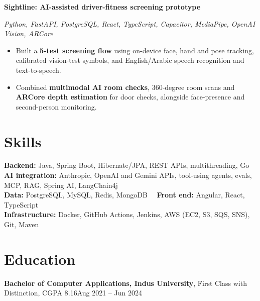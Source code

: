 \documentclass[10pt, letterpaper]{article}
\newenvironment{highlights}{
    \begin{itemize}[
        topsep=0.06 cm,
        parsep=0.04 cm,
        partopsep=0pt,
        itemsep=0pt,
        leftmargin=0.4 cm
    ]
}{
    \end{itemize}
}
\newcommand{\sub}[1]{{\small\textit{#1}}\par}
\begin{document}
    \vspace{0.12 cm}
    \textbf{Sightline: AI-assisted driver-fitness screening prototype}\par
    \sub{Python, FastAPI, PostgreSQL, React, TypeScript, Capacitor, MediaPipe, OpenAI Vision, ARCore}
    \begin{highlights}
        \item Built a \textbf{5-test screening flow} using on-device face, hand and pose tracking, calibrated vision-test
              symbols, and English/Arabic speech recognition and text-to-speech.
        \item Combined \textbf{multimodal AI room checks}, 360-degree room scans and \textbf{ARCore depth estimation}
              for door checks, alongside face-presence and second-person monitoring.
    \end{highlights}

    \section{Skills}

    \textbf{Backend:} Java, Spring Boot, Hibernate/JPA, REST APIs, multithreading, Go \\
    \textbf{AI integration:} Anthropic, OpenAI and Gemini APIs, tool-using agents, evals, MCP, RAG, Spring AI, LangChain4j \\
    \textbf{Data:} PostgreSQL, MySQL, Redis, MongoDB \ \textbar\ \textbf{Front end:} Angular, React, TypeScript \\
    \textbf{Infrastructure:} Docker, GitHub Actions, Jenkins, AWS (EC2, S3, SQS, SNS), Git, Maven

    \section{Education}

    \textbf{Bachelor of Computer Applications, Indus University}, First Class with Distinction, CGPA 8.16\hfill Aug 2021 -- Jun 2024
\end{document}
